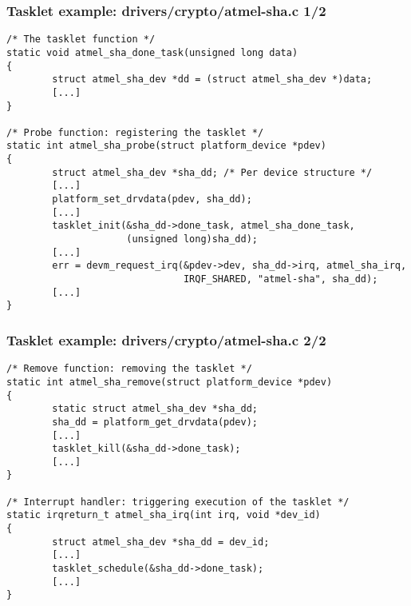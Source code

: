 \begin{frame}[fragile]
  \frametitle{Tasklet example: drivers/crypto/atmel-sha.c 1/2}
\begin{verbatim}
/* The tasklet function */
static void atmel_sha_done_task(unsigned long data)
{
        struct atmel_sha_dev *dd = (struct atmel_sha_dev *)data;
        [...]
}

/* Probe function: registering the tasklet */
static int atmel_sha_probe(struct platform_device *pdev)
{
        struct atmel_sha_dev *sha_dd; /* Per device structure */
        [...]
        platform_set_drvdata(pdev, sha_dd);
        [...]
        tasklet_init(&sha_dd->done_task, atmel_sha_done_task,
                     (unsigned long)sha_dd);
        [...]
        err = devm_request_irq(&pdev->dev, sha_dd->irq, atmel_sha_irq,
                               IRQF_SHARED, "atmel-sha", sha_dd);
        [...]
}
\end{verbatim}
\end{frame}

\begin{frame}[fragile]
  \frametitle{Tasklet example: drivers/crypto/atmel-sha.c 2/2}
\begin{verbatim}
/* Remove function: removing the tasklet */
static int atmel_sha_remove(struct platform_device *pdev)
{
        static struct atmel_sha_dev *sha_dd;
        sha_dd = platform_get_drvdata(pdev);
        [...]
        tasklet_kill(&sha_dd->done_task);
        [...]
}

/* Interrupt handler: triggering execution of the tasklet */
static irqreturn_t atmel_sha_irq(int irq, void *dev_id)
{
        struct atmel_sha_dev *sha_dd = dev_id;
        [...]
        tasklet_schedule(&sha_dd->done_task);
        [...]
}
\end{verbatim}
\end{frame}

